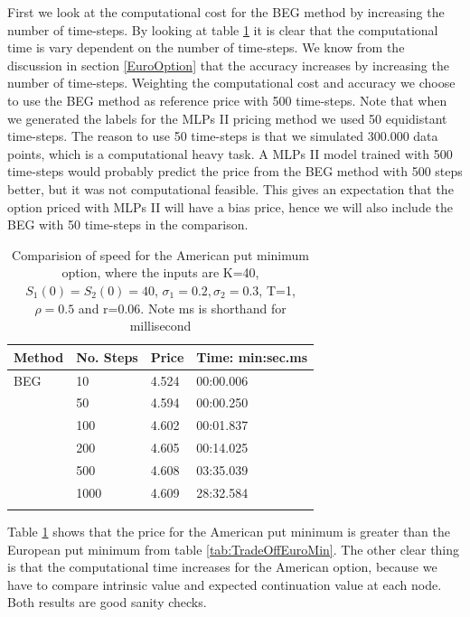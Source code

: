 First we look at the computational cost for the BEG method by increasing the number of time-steps. By looking at table \ref{tab:TradeOffAmerMin} it is clear that the computational time is vary dependent on the number of time-steps. We know from the discussion in section \ref{EuroOption} that the accuracy increases by increasing the number of time-steps. Weighting the computational cost and accuracy we choose to use the BEG method as reference price with 500 time-steps. Note that when we generated the labels for the MLPs II pricing method we used 50 equidistant time-steps. The reason to use 50 time-steps is that we simulated 300.000 data points, which is a computational heavy task. A MLPs II model trained with 500 time-steps would probably predict the price from the BEG method with 500 steps better, but it was not computational feasible. This gives an expectation that the option priced with MLPs II will have a bias price, hence we will also include the BEG with 50 time-steps in the comparison.\\

\begin{table}[th]
\caption{Comparision of speed for the American put minimum option, where the inputs are K=40, $S_1(0)=S_2(0)=40$, $\sigma_1=0.2, \sigma_2=0.3$, T=1, $\rho=0.5$  and r=0.06. Note ms is shorthand for millisecond}
\label{tab:TradeOffAmerMin}
\centering
\begin{tabular}{l l l l}
\toprule
\textbf{Method} & \textbf{No. Steps} & \textbf{Price} & \textbf{Time: min:sec.ms} \\
\midrule
BEG & 10 & 4.524 & 00:00.006\\
& 50 & 4.594 & 00:00.250\\
& 100 & 4.602 & 00:01.837\\
& 200 & 4.605 & 00:14.025\\
& 500 & 4.608 & 03:35.039\\
& 1000 & 4.609 & 28:32.584\\
\bottomrule\\
\end{tabular}
\end{table}

Table \ref{tab:TradeOffAmerMin} shows that the price for the American put minimum is greater than the European put minimum from table \ref{tab:TradeOffEuroMin}. The other clear thing is that the computational time increases for the American option, because we have to compare intrinsic value and expected continuation value at each node. Both results are good sanity checks.\\

